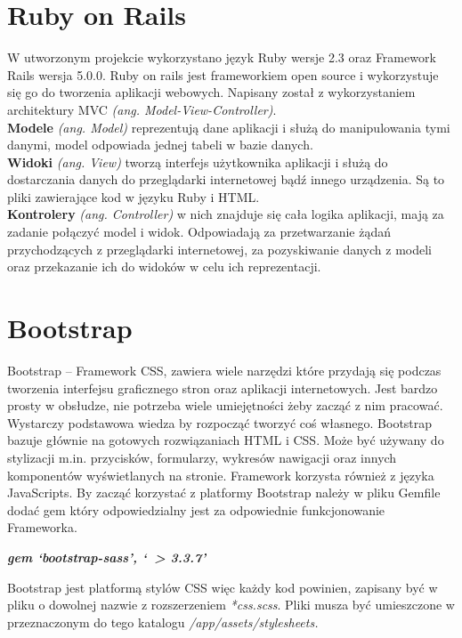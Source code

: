 \documentclass[openright]{xmgr}
\begin{document}
	\section{Ruby on Rails}
	
	W utworzonym projekcie wykorzystano język Ruby wersje 2.3 oraz Framework Rails wersja 5.0.0. Ruby on rails jest frameworkiem open source i wykorzystuje się go do tworzenia aplikacji webowych. Napisany został z wykorzystaniem architektury MVC \emph{(ang. Model-View-Controller)}.\\
	
	\textbf{Modele} \emph{(ang. Model)} reprezentują dane aplikacji i służą do manipulowania tymi danymi, model odpowiada jednej tabeli w bazie danych.\\
	
	
	\textbf{Widoki} \emph{(ang. View)} tworzą interfejs użytkownika aplikacji i służą do dostarczania danych do przeglądarki internetowej bądź innego urządzenia. Są to pliki zawierające kod w języku Ruby i HTML.\\
	
	\textbf{Kontrolery} \emph{(ang. Controller)} w nich znajduje się cała logika aplikacji, mają za zadanie połączyć model i widok. Odpowiadają za przetwarzanie żądań przychodzących z przeglądarki internetowej, za pozyskiwanie danych z modeli oraz przekazanie ich do widoków w celu ich reprezentacji.

	
	\section{Bootstrap}
	
	Bootstrap – Framework CSS, zawiera wiele narzędzi które przydają się podczas tworzenia interfejsu graficznego stron oraz aplikacji internetowych. Jest bardzo prosty w obsłudze, nie potrzeba wiele umiejętności żeby zacząć z nim pracować. Wystarczy podstawowa wiedza by rozpocząć tworzyć coś własnego. Bootstrap bazuje głównie na gotowych rozwiązaniach HTML i CSS. Może być używany do stylizacji m.in. przycisków, formularzy, wykresów nawigacji oraz innych komponentów wyświetlanych na stronie. Framework korzysta również z języka JavaScripts. By zacząć korzystać z platformy Bootstrap należy w pliku Gemfile dodać gem który odpowiedzialny jest za odpowiednie funkcjonowanie Frameworka.
	
	\begin{center}
		\textbf{\textit{gem ‘bootstrap-sass’, ‘~> 3.3.7’}}
	\end{center}
	Bootstrap jest platformą stylów CSS więc każdy kod powinien, zapisany być w pliku o dowolnej nazwie z rozszerzeniem \textit{*css.scss}. Pliki musza być umieszczone w przeznaczonym do tego katalogu \textit{/app/assets/stylesheets.\textbf{}}\\
	
\end{document}
